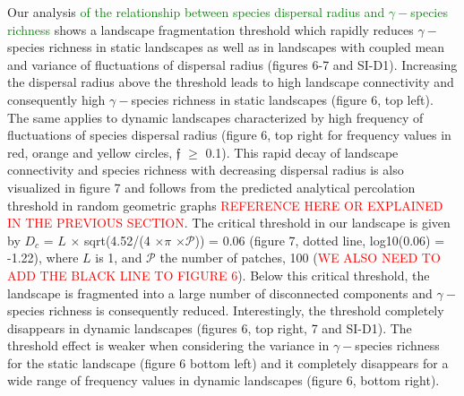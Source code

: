 \documentclass[12pt]{article}
\newcommand{\carlos}[1]{\textcolor{Red}{#1}}
\newcommand{\JK}[1]{\textcolor{Green}{#1}}
\begin{document}
Our analysis \JK{of the relationship between species dispersal radius and $\gamma-$species richness} shows a landscape fragmentation threshold which rapidly reduces $\gamma-$species richness in static landscapes as well as in landscapes with coupled mean and variance of fluctuations of dispersal radius (figures 6-7 and SI-D1). Increasing the dispersal radius above the threshold leads to high landscape connectivity and consequently high $\gamma-$species richness in static landscapes (figure 6, top left). The same applies to dynamic landscapes characterized by high frequency of fluctuations of species dispersal radius (figure 6, top right for frequency values in red, orange and yellow circles, $\mathfrak{f}$ $\geq$ 0.1). This rapid decay of landscape connectivity and species richness with decreasing dispersal radius is also visualized in figure 7 and follows from the predicted analytical percolation threshold in random geometric graphs \carlos{REFERENCE HERE OR EXPLAINED IN THE PREVIOUS SECTION}. The critical threshold in our landscape is given by $D_c$ = $L$ $\times$ sqrt(4.52/(4 $\times$$\pi$ $\times$$\mathcal{P}$)) = 0.06 (figure 7, dotted line, log10(0.06) = -1.22), where $L$ is 1, and $\mathcal{P}$ the number of patches, 100 (\carlos{WE ALSO NEED TO ADD THE BLACK LINE TO FIGURE 6}). Below this critical threshold, the landscape is fragmented into a large number of disconnected components and $\gamma-$species richness is consequently reduced. Interestingly, the threshold completely disappears in dynamic landscapes (figures 6, top right, 7 and SI-D1). The threshold effect is weaker when considering the variance in $\gamma-$species richness for the static landscape (figure 6 bottom left) and it completely disappears for a wide range of frequency values in dynamic landscapes (figure 6, bottom right). 
\end{document}
